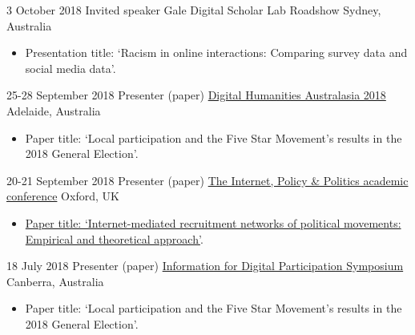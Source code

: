\documentclass[11pt,a4paper,sans]{moderncv}
\begin{document}
  
    \cventry
      {3 October 2018} %
    {Invited speaker} %
    {Gale Digital Scholar Lab Roadshow} %
    {Sydney, Australia} %
  {}
    {
      \begin{itemize} %
        \item {Presentation title: `Racism in online interactions: Comparing survey data and social media data'.}
      \end{itemize}
    }

    \cventry
        {25-28 September 2018} %
    {Presenter (paper)} %
    {\href{http://dha-2018.p.dha2018.currinda.com/days/2018-09-28}{Digital Humanities Australasia 2018}} %
    {Adelaide, Australia} %
{}
    {
      \begin{itemize} %
        \item {Paper title: `Local participation and the Five Star Movement’s results in the 2018 General Election'.}
      \end{itemize}
    }


    \cventry
        {20-21 September 2018} %
    {Presenter (paper)} %
    {\href{http://blogs.oii.ox.ac.uk/policy/ipp-conference/papers/}{The Internet, Policy \& Politics academic conference}} %
    {Oxford, UK} %
{}
    {
      \begin{itemize} %
        \item {\href{http://blogs.oii.ox.ac.uk/policy/wp-content/uploads/sites/77/2018/09/IPP2018-Bailo.pdf}{Paper title: `Internet-mediated recruitment networks of political movements: Empirical and theoretical approach'}.}
      \end{itemize}
    }


    \cventry
        {18 July 2018} %
    {Presenter (paper)} %
    {\href{https://www.canberra.edu.au/research/faculty-research-centres/nmrc/news-and-events/events/digital-participation}{Information for Digital Participation Symposium}} %
    {Canberra, Australia} %
{}
    {
      \begin{itemize} %
        \item {Paper title: `Local participation and the Five Star Movement’s results in the 2018 General Election'.}
      \end{itemize}
    }
\end{document}
